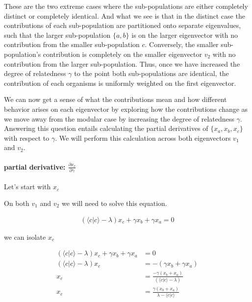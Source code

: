 \documentclass[
  letterpaper,
  DIV=11,
  numbers=noendperiod]{scrartcl}
\let\oldparagraph\paragraph
\renewcommand{\paragraph}[1]{\oldparagraph{#1}\mbox{}}
\begin{document}
These are the two extreme cases where the sub-populations are either
completely distinct or completely identical. And what we see is that in
the distinct case the contributions of each sub-population are
partitioned onto separate eigenvalues, such that the larger
sub-population \(\{a, b\}\) is on the larger eigenvector with no
contribution from the smaller sub-population \(c\). Conversely, the
smaller sub-population's contribution is completely on the smaller
eigenvector \(v_2\) with no contribution from the larger sub-population.
Thus, once we have increased the degree of relatedness \(\gamma\) to the
point both sub-populations are identical, the contribution of each
organisms is uniformly weighted on the first eigenvector.

We can now get a sense of what the contributions mean and how different
behavior arises on each eigenvector by exploring how the contributions
change as we move away from the modular case by increasing the degree of
relatedness \(\gamma\). Answering this question entails calculating the
partial derivatives of \(\{x_a, x_b, x_c\}\) with respect to \(\gamma\).
We will perform this calculation across both eigenvectors \(v_1\) and
\(v_2\).

\hypertarget{partial-derivative-fracpartial-x_cpartial-gamma}{%
\paragraph{\texorpdfstring{partial derivative:
\(\frac{\partial x_c}{\partial \gamma}\)}{partial derivative: \textbackslash frac\{\textbackslash partial x\_c\}\{\textbackslash partial \textbackslash gamma\}}}\label{partial-derivative-fracpartial-x_cpartial-gamma}}

Let's start with \(x_c\)

On both \(v_1\) and \(v_2\) we will need to solve this equation.

\begin{align*}
(\langle c|c \rangle-\lambda)x_c + \gamma x_b + \gamma x_a = 0
\end{align*}

we can isolate \(x_c\)

\begin{align*}
(\langle c|c \rangle-\lambda)x_c + \gamma x_b + \gamma x_a &= 0 \\
(\langle c|c \rangle-\lambda)x_c &= -(\gamma x_b + \gamma x_a)\\
x_c &= \frac{-\gamma(x_b + x_a)}{(\langle c|c \rangle-\lambda)}\\
x_c &= \frac{\gamma(x_b + x_a)}{\lambda - \langle c|c \rangle}\\
\end{align*}
\end{document}
